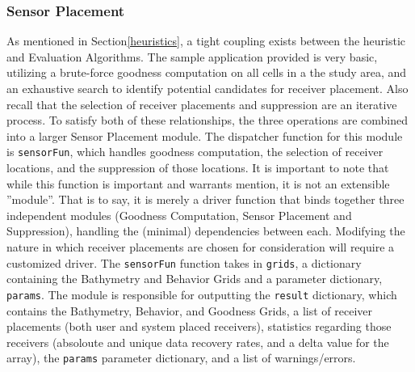 \subsubsection{Sensor Placement}
As mentioned in Section\ref{heuristics}, a tight coupling exists between the heuristic and Evaluation Algorithms.  The sample application provided is very basic, utilizing a brute-force goodness computation on all cells in a the study area, and an exhaustive search to identify potential candidates for receiver placement.  Also recall that the selection of receiver placements and suppression are an iterative process.  To satisfy both of these relationships, the three operations are combined into a larger Sensor Placement module.  The dispatcher function for this module is \texttt{sensorFun}, which handles goodness computation, the selection of receiver locations, and the suppression of those locations.  It is important to note that while this function is important and warrants mention, it is not an extensible ''module''.  That is to say, it is merely a driver function that binds together three independent modules (Goodness Computation, Sensor Placement and Suppression), handling the (minimal) dependencies between each.  Modifying the nature in which receiver placements are chosen for consideration will require a customized driver.  The \texttt{sensorFun} function takes in \texttt{grids}, a dictionary containing the Bathymetry and Behavior Grids and a parameter dictionary, \texttt{params}.  The module is responsible for outputting the \texttt{result} dictionary, which contains the Bathymetry, Behavior, and Goodness Grids, a list of receiver placements (both user and system placed receivers), statistics regarding those receivers (absoloute and unique data recovery rates, and a delta value for the array), the \texttt{params} parameter dictionary, and a list of warnings/errors.

